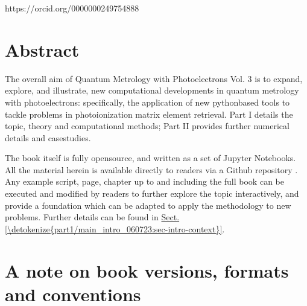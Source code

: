 \documentclass[letterpaper,table,10pt,english]{jupyterBook}
\begin{document}
https://orcid.org/0000\sphinxhyphen{}0002\sphinxhyphen{}4975\sphinxhyphen{}4888


\sphinxstepscope


\chapter{Abstract}
\label{\detokenize{frontmatter/abstract:abstract}}\label{\detokenize{frontmatter/abstract::doc}}
\sphinxAtStartPar
The overall aim of Quantum Metrology with Photoelectrons Vol. 3 is to expand, explore, and illustrate, new computational developments in quantum metrology with photoelectrons: specifically, the application of new python\sphinxhyphen{}based tools to tackle problems in photoionization matrix element retrieval. Part I details the topic, theory and computational methods; Part II provides further numerical details and case\sphinxhyphen{}studies.

\sphinxAtStartPar
The book itself is fully open\sphinxhyphen{}source, and written as a set of Jupyter Notebooks. All the material herein is available directly to readers via a Github repository . Any example script, page, chapter \sphinxhyphen{} up to and including the full book \sphinxhyphen{} can be executed and modified by readers to further explore the topic interactively, and provide a foundation which can be adapted to apply the methodology to new problems. Further details can be found in \hyperref[\detokenize{part1/main_intro_060723:sec-intro-context}]{Sect.\@ \ref{\detokenize{part1/main_intro_060723:sec-intro-context}}}.

\sphinxstepscope


\chapter{A note on book versions, formats and conventions}
\label{\detokenize{frontmatter/book_versions_note:a-note-on-book-versions-formats-and-conventions}}\label{\detokenize{frontmatter/book_versions_note:chpt-book-versions}}\label{\detokenize{frontmatter/book_versions_note::doc}}
\end{document}
